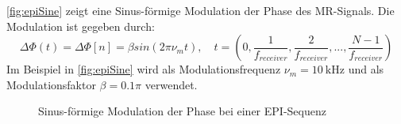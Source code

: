 \autoref{fig:epiSine} zeigt eine Sinus-förmige Modulation der Phase des MR-Signals. Die Modulation ist gegeben durch:
\begin{equation}
	\Delta \Phi(t)=\Delta \Phi[n]= \beta sin(2 \pi \nu_m t), \quad t=(0,\frac{1}{f_{receiver}},\frac{2}{f_{receiver}},...,\frac{N-1}{f_{receiver}})
\end{equation}
Im Beispiel in \autoref{fig:epiSine} wird als Modulationsfrequenz $\nu_m=\SI{10}{\kilo\hertz}$ und als Modulationsfaktor $\beta=0.1 \pi$ verwendet.

\begin{figure}[H]
	\centering
	\hfill
	
	\caption{Sinus-förmige Modulation der Phase bei einer EPI-Sequenz}
	\label{fig:epiSine}	
\end{figure}














